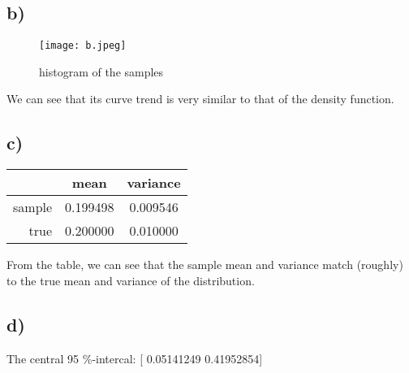 \documentclass{article}
\begin{document}
 	\subsection*{b)}
 	\begin{figure}[H]
 		\centering
 		\captionsetup{justification=centering}
 		\texttt{[image: b.jpeg]}
 		\caption{histogram of the samples}
 	\end{figure}
 	We can see that its curve trend is very similar to that of the density function.
 	\subsection*{c)}
 		\begin{table}[H]	
 		\centering
 		\begin{tabular}{r|c|c}
 		 \hline	
 	\quad  & mean    & variance \\
 	\hline
 	sample  & 0.199498  & 0.009546 \\
 	true    & 0.200000  & 0.010000 \\
 	\hline
 	  \end{tabular}
	 \end{table}
    From the table, we can see that the sample mean and variance match (roughly) to the true mean and variance of the distribution.
 	\subsection*{d)}	
 		\begin{center}
		The central 95 \%-intercal: [ 0.05141249  0.41952854]
		\end{center}
	
\end{document}
